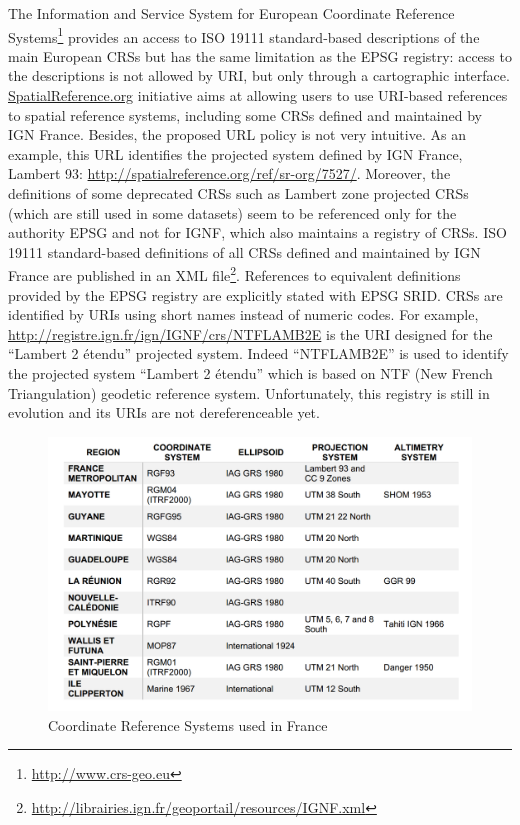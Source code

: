 The Information and Service System for European Coordinate Reference Systems\footnote{\url{http://www.crs-geo.eu}}  provides an access to ISO 19111 standard-based descriptions of the main European CRSs but has the same limitation as the EPSG registry: access to the descriptions is not allowed by URI, but only through a cartographic interface.
\url{SpatialReference.org} initiative aims at allowing users to use URI-based references to spatial reference systems, including some CRSs defined and maintained by IGN France.  Besides, the proposed URL policy is not very intuitive. As an example, this URL identifies the projected system defined by IGN France, Lambert 93: \url{http://spatialreference.org/ref/sr-org/7527/}. Moreover, the definitions of some deprecated CRSs such as Lambert zone projected CRSs (which are still used in some datasets) seem to be referenced only for the authority EPSG and not for IGNF, which also maintains a registry of CRSs. ISO 19111 standard-based definitions of all CRSs defined and maintained by IGN France are  published in an XML file\footnote{\url{ http://librairies.ign.fr/geoportail/resources/IGNF.xml}}.
References to equivalent definitions provided by the EPSG registry are explicitly stated with EPSG SRID. CRSs are identified by URIs using short names instead of numeric codes. For example, \url{http://registre.ign.fr/ign/IGNF/crs/NTFLAMB2E}  is the URI designed for the ``Lambert 2 \'{e}tendu'' projected system. Indeed ``NTFLAMB2E'' is used to identify the projected system ``Lambert 2 \'{e}tendu'' which is based on NTF (New French Triangulation) geodetic reference system. Unfortunately, this registry is still in evolution and its URIs are not dereferenceable yet.

\begin{figure}[!htbp]
 \begin{center}
  \includegraphics[width=120mm]{img/crs-france.png}
  \caption{Coordinate Reference Systems used in France}%
  \label{fig:crsinfr}
 \end{center}
\end{figure}
 
